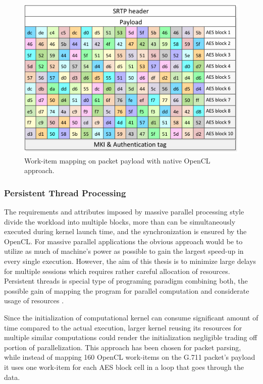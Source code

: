 \begin{figure}[H]
\centering
\includegraphics[width=12cm]{fig/packet_mp.pdf}
\caption{Work-item mapping on packet payload with native OpenCL approach.}
\label{mp_payload}
\end{figure}



\subsubsection*{Persistent Thread Processing}
The requirements and attributes imposed by massive parallel processing
style divide the workload into multiple blocks, more than can be simultaneously
executed during kernel launch time, and the synchronization is ensured by the
OpenCL. For massive parallel applications the obvious approach would be to 
utilize as much of machine's power as possible to gain the largest speed-up in 
every single execution. However, the aim of this thesis is to minimize large 
delays for multiple sessions which requires rather careful allocation of
resources. Persistent threads is special type of programing paradigm combining 
both, the possible gain of mapping the program for parallel computation and
considerate usage of resources \cite{pt}.

Since the initialization of computational kernel can consume significant amount 
of time compared to the actual execution, larger kernel reusing its resources 
for multiple similar computations could render the initialization negligible 
trading off portion of parallelization. This approach has been chosen for
packet parsing, while instead of mapping 160 OpenCL work-items on the G.711 
packet's payload it uses one work-item for each AES block cell in a loop that 
goes through the data.

